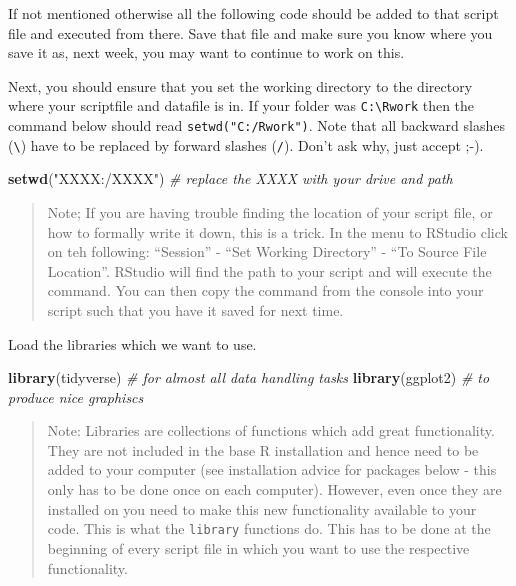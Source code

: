 \documentclass[
]{article}
\newenvironment{Shaded}{\begin{snugshade}}{\end{snugshade}}
\newcommand{\CommentTok}[1]{\textcolor[rgb]{0.56,0.35,0.01}{\textit{#1}}}
\newcommand{\FunctionTok}[1]{\textcolor[rgb]{0.13,0.29,0.53}{\textbf{#1}}}
\newcommand{\NormalTok}[1]{#1}
\newcommand{\StringTok}[1]{\textcolor[rgb]{0.31,0.60,0.02}{#1}}
\begin{document}
If not mentioned otherwise all the following code should be added to
that script file and executed from there. Save that file and make sure
you know where you save it as, next week, you may want to continue to
work on this.

Next, you should ensure that you set the working directory to the
directory where your scriptfile and datafile is in. If your folder was
\texttt{C:\textbackslash{}Rwork} then the command below should read
\texttt{setwd("C:/Rwork")}. Note that all backward slashes
(\texttt{\textbackslash{}}) have to be replaced by forward slashes
(\texttt{/}). Don't ask why, just accept ;-).

\begin{Shaded}
\begin{Highlighting}[]
\FunctionTok{setwd}\NormalTok{(}\StringTok{"XXXX:/XXXX"}\NormalTok{)   }\CommentTok{\# replace the XXXX with your drive and path}
\end{Highlighting}
\end{Shaded}

\begin{quote}
Note; If you are having trouble finding the location of your script
file, or how to formally write it down, this is a trick. In the menu to
RStudio click on teh following: ``Session'' - ``Set Working Directory''
- ``To Source File Location''. RStudio will find the path to your script
and will execute the command. You can then copy the command from the
console into your script such that you have it saved for next time.
\end{quote}

Load the libraries which we want to use.

\begin{Shaded}
\begin{Highlighting}[]
\FunctionTok{library}\NormalTok{(tidyverse)    }\CommentTok{\# for almost all data handling tasks}
\FunctionTok{library}\NormalTok{(ggplot2)      }\CommentTok{\# to produce nice graphiscs}
\end{Highlighting}
\end{Shaded}

\begin{quote}
Note: Libraries are collections of functions which add great
functionality. They are not included in the base R installation and
hence need to be added to your computer (see installation advice for
packages below - this only has to be done once on each computer).
However, even once they are installed on you need to make this new
functionality available to your code. This is what the \texttt{library}
functions do. This has to be done at the beginning of every script file
in which you want to use the respective functionality.
\end{quote}
\end{document}
